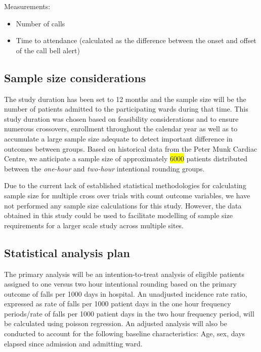 \documentclass[12pt]{article}
\begin{document}
Measurements:
\begin{itemize}
    \item Number of calls
    \item Time to attendance (calculated as the difference between the onset and offset of the call bell alert)
\end{itemize}

\subsection{Sample size considerations}
The study duration has been set to 12 months and the sample size will be the number of patients admitted to the participating wards during that time. This study duration was chosen based on feasibility considerations and to ensure numerous crossovers, enrollment throughout the calendar year as well as to accumulate a large sample size adequate to detect important difference in outcomes between groups. Based on historical data from the Peter Munk Cardiac Centre, we anticipate a sample size of approximately \colorbox{yellow}{6000} patients distributed between the \textit{one-hour} and \textit{two-hour} intentional rounding groups.

Due to the current lack of established statistical methodologies for calculating sample size for multiple cross over trials with count outcome variables, we have not performed any sample size calculations for this study. However, the data obtained in this study could be used to facilitate modelling of sample size requirements for a larger scale study across multiple sites.


\subsection{Statistical analysis plan}
 The primary analysis will be an intention-to-treat analysis of eligible patients assigned to one versus two hour intentional rounding based on the primary outcome of falls per 1000 days in hospital. An unadjusted incidence rate ratio, expressed as rate of falls per 1000 patient days in the one hour frequency periods/rate of falls per 1000 patient days in the two hour frequency period, will be calculated using poisson regression. An adjusted analysis will also be conducted to account for the following baseline characteristics: Age, sex, days elapsed since admission and admitting ward. 
 
\end{document}
